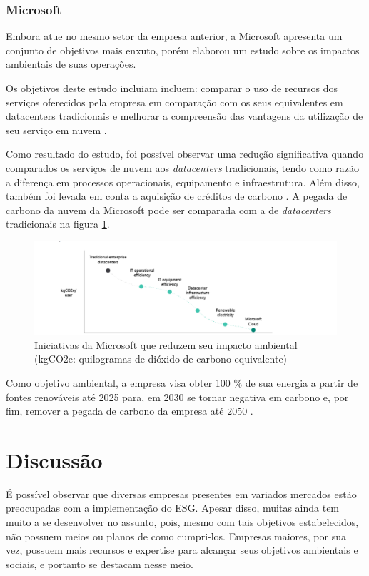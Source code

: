 \documentclass[12pt]{article}
\begin{document}
	\subsubsection*{Microsoft}
	
	Embora atue no mesmo setor da empresa anterior, a Microsoft apresenta um conjunto de objetivos mais enxuto, porém elaborou um estudo sobre os impactos ambientais de suas operações.
	
	Os objetivos deste estudo incluiam incluem: comparar o uso de recursos dos serviços oferecidos pela empresa em comparação com os seus equivalentes em datacenters tradicionais e melhorar a compreensão das vantagens da utilização de seu serviço em nuvem \cite{microsoftCarbonBenefitsCloud2020}.
	
	Como resultado do estudo, foi possível observar uma redução significativa quando comparados os serviços de nuvem aos \emph{datacenters} tradicionais, tendo como razão a diferença em processos operacionais, equipamento e infraestrutura. Além disso, também foi levada em conta a aquisição de créditos de carbono \cite{microsoftCarbonBenefitsCloud2020}. A pegada de carbono da nuvem da Microsoft pode ser comparada com a de \emph{datacenters} tradicionais na figura \ref{fig:microsoft-intiatives}.
	
	\begin{figure}[h]
		\centering
		\includegraphics[width=0.7\linewidth]{pictures/microsoft-intiatives}
		\caption{Iniciativas da Microsoft que reduzem seu impacto ambiental (kgCO2e: quilogramas de dióxido de carbono equivalente)}
		\label{fig:microsoft-intiatives}
	\end{figure}
	
	Como objetivo ambiental, a empresa visa obter 100 \% de sua energia a partir de fontes renováveis até 2025 para, em 2030 se tornar negativa em carbono e, por fim, remover a pegada de carbono da empresa até 2050 \cite{microsoftCarbonBenefitsCloud2020}.
	
	\section*{Discussão}
	
	É possível observar que diversas empresas presentes em variados mercados estão preocupadas com a implementação do ESG. Apesar disso, muitas ainda tem muito a se desenvolver no assunto, pois, mesmo com tais objetivos estabelecidos, não possuem meios ou planos de como cumpri-los. Empresas maiores, por sua vez, possuem mais recursos e expertise para alcançar seus objetivos ambientais e sociais, e portanto se destacam nesse meio.
	
\end{document}
